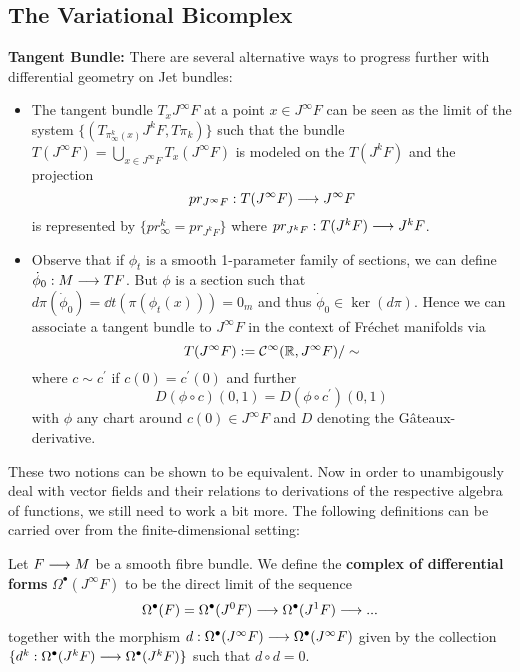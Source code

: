 \subsection{The Variational Bicomplex}

\textbf{Tangent Bundle:} There are several alternative ways to progress further with differential geometry on Jet bundles:
\begin{itemize}
  \item  The tangent bundle $T_xJ^\infty F$ at a point $x\in J^\infty F$ can be seen as the limit of the system $\{ (T_{\pi^k_\infty(x)}J^kF, T\pi_k) \}$ such that the bundle $T(J^\infty F) = \bigcup_{x\in J^\infty F} T_x(J^\infty F)$ is modeled on the $T(J^k F)$ and the projection
  $$ pr_{J^\infty F}: T(J^\infty F) \longrightarrow J^\infty F $$
  is represented by $\{ pr_\infty^k = pr_{J^kF} \}$ where $pr_{J^kF}: T(J^kF) \longrightarrow J^kF$.

  \item Observe that if $\phi_t$ is a smooth 1-parameter family of sections, we can define $\dot \phi_0: M \lra TF$. But $\phi$ is a section such that $d\pi(\dot \phi_0) = \dd{}{t}(\pi(\phi_t(x))) = 0_m$ and thus $\dot \phi_0 \in \ker(d\pi)$. Hence we can associate a tangent bundle to $J^\infty F$ in the context of Fréchet manifolds via
  $$ T(J^\infty F) := \mathcal{C}^{\infty}(\mathbb{R}, J^\infty F) / \sim $$
  where $c\sim c^\prime$ if $c(0) = c^\prime (0)$ and further
  $$ D(\phi\circ c) (0,1) = D(\phi \circ c^\prime) (0,1) $$
  with $\phi$ any chart around $c(0) \in J^\infty F$ and $D$ denoting the Gâteaux-derivative.
\end{itemize}

These two notions can be shown to be equivalent. Now in order to unambigously deal with vector fields and their relations to derivations of the respective algebra of functions, we still need to work a bit more. The following definitions can be carried over from the finite-dimensional setting:

\begin{definition}
Let $F\longrightarrow M$ be a smooth fibre bundle. We define the \textbf{complex of differential forms} $\Omega^\bullet(J^\infty F)$ to be the direct limit of the sequence
$$ \Omega^\bullet(F) = \Omega^\bullet(J^0F) \longrightarrow \Omega^\bullet(J^1F)\longrightarrow ... $$
together with the morphism $d:\Omega^\bullet(J^\infty F)\longrightarrow \Omega^\bullet(J^\infty F)$ given by the collection $\{ d^k: \Omega^\bullet(J^k F) \longrightarrow \Omega^\bullet(J^k F) \}$ such that $d\circ d = 0$.
\end{definition}

